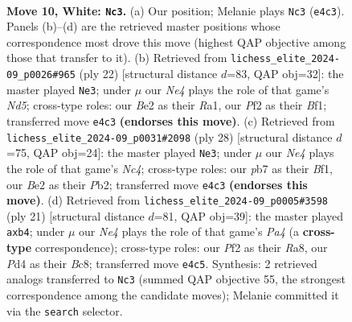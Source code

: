 \documentclass[11pt]{article}
\begin{document}
\clearpage

\begin{figure}[p]\centering
\begin{subfigure}{0.46\textwidth}\centering
\resizebox{\linewidth}{!}{%
\newchessgame
\chessboard[
  setfen={r1bqk2r/pp1n1ppp/2p5/3p2b1/3PN3/4P3/PP2BPPP/R2QK1NR w KQkq - 0 10},
  showmover=false,
  pgfstyle=straightmove, color=movearrow, markmove={e4-c3}
]}
\caption{}
\end{subfigure}\hfill
\begin{subfigure}{0.46\textwidth}\centering
\resizebox{\linewidth}{!}{%
\newchessgame
\chessboard[
  setfen={r1bqk2r/4nppp/p2p1b2/1p1Np3/4P3/N1P5/PP3PPP/R2QKB1R w KQkq - 1 12},
  showmover=false,
  pgfstyle=straightmove, color=movearrow, markmove={d5-e3}
]}
\caption{}
\end{subfigure}
\\[4pt]
\begin{subfigure}{0.46\textwidth}\centering
\resizebox{\linewidth}{!}{%
\newchessgame
\chessboard[
  setfen={2rqkb1r/1p2np1p/p2p1p2/3Pp3/2N5/8/PPP2PPP/R2QKB1R w KQk - 2 15},
  showmover=false,
  pgfstyle=straightmove, color=movearrow, markmove={c4-e3}
]}
\caption{}
\end{subfigure}\hfill
\begin{subfigure}{0.46\textwidth}\centering
\resizebox{\linewidth}{!}{%
\newchessgame
\chessboard[
  setfen={r1bqk2r/1p3ppp/2n5/p2p4/1B1Nn3/1P2P3/P3BPPP/RN1QK2R b KQkq - 0 11},
  showmover=false,
  pgfstyle=straightmove, color=movearrow, markmove={a5-b4}
]}
\caption{}
\end{subfigure}
\caption{\textbf{Move 10, White: \texttt{Nc3}.} (a) Our position; Melanie plays \texttt{Nc3} (\texttt{e4c3}). Panels (b)--(d) are the retrieved master positions whose correspondence most drove this move (highest QAP objective among those that transfer to it). (b) Retrieved from \texttt{lichess\_elite\_2024-09\_p0026\#965} (ply 22) [structural distance $d$=83, QAP obj=32]: the master played \texttt{Ne3}; under $\mu$ our \emph{Ne4} plays the role of that game's \emph{Nd5}; cross-type roles: our \emph{B}e2 as their \emph{R}a1, our \emph{P}f2 as their \emph{B}f1; transferred move \texttt{e4c3} \textbf{(endorses this move)}. (c) Retrieved from \texttt{lichess\_elite\_2024-09\_p0031\#2098} (ply 28) [structural distance $d$=75, QAP obj=24]: the master played \texttt{Ne3}; under $\mu$ our \emph{Ne4} plays the role of that game's \emph{Nc4}; cross-type roles: our \emph{p}b7 as their \emph{B}f1, our \emph{B}e2 as their \emph{P}b2; transferred move \texttt{e4c3} \textbf{(endorses this move)}. (d) Retrieved from \texttt{lichess\_elite\_2024-09\_p0005\#3598} (ply 21) [structural distance $d$=81, QAP obj=39]: the master played \texttt{axb4}; under $\mu$ our \emph{Ne4} plays the role of that game's \emph{Pa4} (a \textbf{cross-type} correspondence); cross-type roles: our \emph{P}f2 as their \emph{R}a8, our \emph{P}d4 as their \emph{B}c8; transferred move \texttt{e4c5}. Synthesis: 2 retrieved analogs transferred to \texttt{Nc3} (summed QAP objective 55, the strongest correspondence among the candidate moves); Melanie committed it via the \texttt{search} selector.}
\label{fig:thought-m18}
\end{figure}
\end{document}
